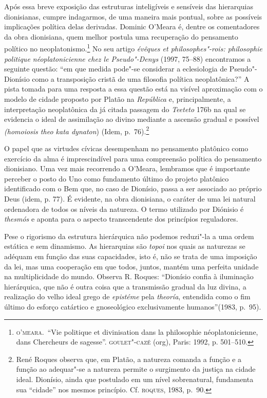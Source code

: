 {Após essa breve exposição das estruturas inteligíveis e
sensíveis das hierarquias dionisianas, cumpre indagarmos, de uma
maneira mais pontual, sobre as possíveis implicações política delas
derivadas.  Dominic O’Meara é, dentre os comentadores da obra
dionisiana, quem melhor postula uma recuperação do pensamento político
no neoplatonismo.\footnote{ \textsc{o’meara}.~``Vie politique et divinisation
dans la philosophie néoplatonicienne, dans Chercheurs de sagesse''.
\textsc{goulet"-cazé} (org), Paris: 1992, p. 501--510.} No seu artigo
\emph{évêques et philosophes"-rois: philosophie politique
néoplatonicienne chez le Pseudo"-Denys} (1997, 75--88) encontramos a
seguinte questão: ``em que medida pode"-se considerar a
eclesiologia de Pseudo"-Dionísio como a transposição cristã de uma
filosofia política neoplatônica?'' A pista tomada para uma resposta a
essa questão está na visível aproximação com o modelo de cidade
proposto por Platão na \emph{República }e, principalmente, a
interpretação neoplatônica da já citada passagem do \emph{Teeteto}
176b na qual se evidencia o ideal de assimilação ao divino mediante a
ascensão gradual e possível \emph{(homoiosis theo kata dynaton})
(Idem, p.~76).\footnote{ René Roques observa que, em Platão, a natureza
comanda a função e a função ao adequar"-se a natureza permite o
surgimento da justiça na cidade ideal. Dionísio, ainda que postulado em
um nível sobrenatural, fundamenta sua “cidade” nos mesmos princípio.
Cf. \textsc{roques}, 1983, p.~90.}

O papel que as virtudes cívicas desempenham no pensamento platônico
como exercício da alma é imprescindível para uma compreensão política
do pensamento dionisiano. Uma vez mais recorrendo a O’Meara, lembramos
que é importante perceber o posto do Uno como fundamento último do
projeto platônico identificado com o Bem que, no caso de Dionísio,
passa a ser associado ao próprio Deus (idem, p. 77). É evidente, na
obra dionisiana, o caráter de uma lei natural ordenadora de todos os
níveis da natureza. O termo utilizado por Diónisio é \emph{thesmós} e
aponta para o aspecto transcendente dos princípios reguladores.

Pese o rigorismo da estrutura hierárquica não podemos reduzi"-la a
uma ordem estática e sem dinamismo. As hierarquias são \emph{topoi}
nos quais as naturezas se adéquam em função das suas capacidades, isto
é, não se trata de uma imposição da lei, mas uma cooperação em que
todos, juntos, mantém uma perfeita unidade na multiplicidade do
mundo. Observa R. Roques: ``Dionísio confia à iluminação
hierárquica, que não é outra coisa que a transmissão gradual da luz
divina, a realização do velho ideal grego de \textit{epistéme} pela
\textit{theoría}, entendida como o fim último do esforço catártico e
gnoseológico exclusivamente humanos''(1983, p.~95).

}
